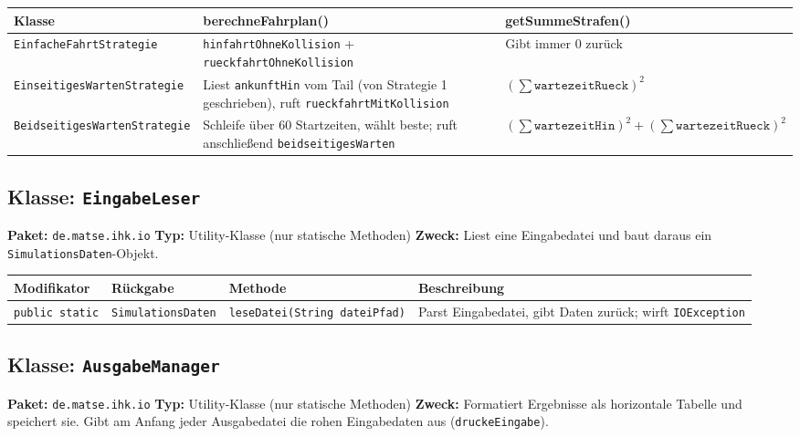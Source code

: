 \documentclass[12pt,a4paper]{article}
\begin{document}
\begin{center}
\small
\begin{tabular}{p{4cm}p{4.5cm}p{5.5cm}}
\toprule
\textbf{Klasse} & \textbf{berechneFahrplan()} & \textbf{getSummeStrafen()} \\
\midrule
\texttt{EinfacheFahrtStrategie}
  & \texttt{hinfahrtOhneKollision} + \texttt{rueckfahrtOhneKollision}
  & Gibt immer 0 zurück \\
\addlinespace
\texttt{EinseitigesWartenStrategie}
  & Liest \texttt{ankunftHin} vom Tail (von Strategie 1 geschrieben), ruft \texttt{rueckfahrtMitKollision}
  & $(\sum \mathtt{wartezeitRueck})^2$ \\
\addlinespace
\texttt{BeidseitigesWartenStrategie}
  & Schleife über 60 Startzeiten, wählt beste; ruft anschließend \texttt{beidseitigesWarten}
  & $(\sum \mathtt{wartezeitHin})^2 + (\sum \mathtt{wartezeitRueck})^2$ \\
\bottomrule
\end{tabular}
\end{center}

\subsection{Klasse: \texttt{EingabeLeser}}

\textbf{Paket:} \texttt{de.matse.ihk.io} \quad
\textbf{Typ:} Utility-Klasse (nur statische Methoden) \quad
\textbf{Zweck:} Liest eine Eingabedatei und baut daraus ein \texttt{SimulationsDaten}-Objekt.

\begin{center}
\small
\begin{tabular}{lllp{5.5cm}}
\toprule
\textbf{Modifikator} & \textbf{Rückgabe} & \textbf{Methode} & \textbf{Beschreibung} \\
\midrule
\texttt{public static} & \texttt{SimulationsDaten} & \texttt{leseDatei(String dateiPfad)} & Parst Eingabedatei, gibt Daten zurück; wirft \texttt{IOException} \\
\bottomrule
\end{tabular}
\end{center}

\subsection{Klasse: \texttt{AusgabeManager}}

\textbf{Paket:} \texttt{de.matse.ihk.io} \quad
\textbf{Typ:} Utility-Klasse (nur statische Methoden) \quad
\textbf{Zweck:} Formatiert Ergebnisse als horizontale Tabelle und speichert sie.
Gibt am Anfang jeder Ausgabedatei die rohen Eingabedaten aus (\texttt{druckeEingabe}).
\end{document}
